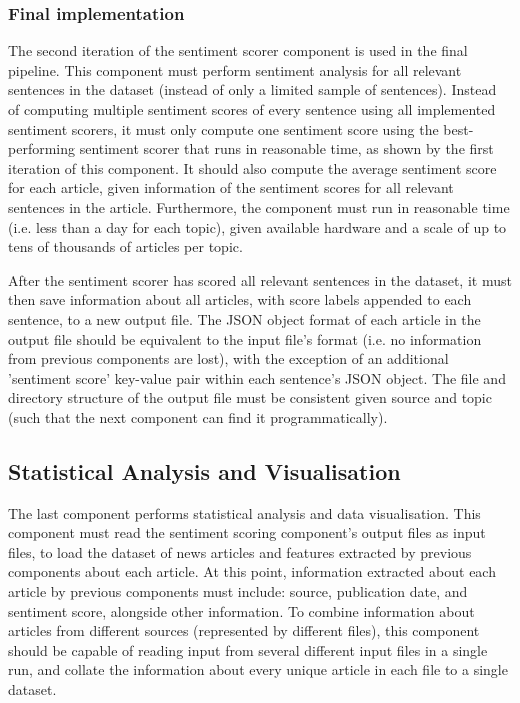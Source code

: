 \documentclass{report}
\begin{document}
\subsubsection{Final implementation} \label{req-sentiment-final}

The second iteration of the sentiment scorer component is used in the final pipeline.
This component must perform sentiment analysis for all relevant sentences in the dataset (instead of only a limited sample of sentences).
Instead of computing multiple sentiment scores of every sentence using all implemented sentiment scorers, it must only compute one sentiment score using the best-performing sentiment scorer that runs in reasonable time, as shown by the first iteration of this component.
It should also compute the average sentiment score for each article, given information of the sentiment scores for all relevant sentences in the article.
Furthermore, the component must run in reasonable time (i.e. less than a day for each topic), given available hardware and a scale of up to tens of thousands of articles per topic.

After the sentiment scorer has scored all relevant sentences in the dataset, it must then save information about all articles, with score labels appended to each sentence, to a new output file.
The JSON object format of each article in the output file should be equivalent to the input file's format (i.e. no information from previous components are lost), with the exception of an additional 'sentiment score' key-value pair within each sentence's JSON object.
The file and directory structure of the output file must be consistent given source and topic (such that the next component can find it programmatically).

\subsection{Statistical Analysis and Visualisation} \label{req-visualisation}

The last component performs statistical analysis and data visualisation.
This component must read the sentiment scoring component's output files as input files, to load the dataset of news articles and features extracted by previous components about each article.
At this point, information extracted about each article by previous components must include: source, publication date, and sentiment score, alongside other information.
To combine information about articles from different sources (represented by different files), this component should be capable of reading input from several different input files in a single run, and collate the information about every unique article in each file to a single dataset.
\end{document}
